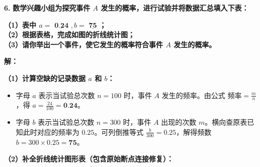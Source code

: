 \documentclass[12pt, a4paper]{ctexrep}
\begin{document}
\vspace{0.6cm}

\textbf{\LARGE 6.} \textbf{数学兴趣小组为探究事件 $A$ 发生的概率，进行试验并将数据汇总填入下表：}

\vspace{0.3cm}
\begin{center}
\renewcommand{\arraystretch}{1.8}
\end{center}

\vspace{0.4cm}
\textbf{（1）表中 $a = \underline{\textbf{  0.24  }}, b = \underline{\textbf{  75  }}$；\\
（2）根据表格，完成如图的折线统计图；\\
（3）请你举出一个事件，使它发生的概率符合事件 $A$ 发生的概率。}

\vspace{0.4cm}
\textbf{解：}

\textbf{（1）计算空缺的记录数据 $a$ 和 $b$：}
\begin{itemize}
    \item 字母 $a$ 表示当试验总次数 $n=100$ 时，事件 $A$ 发生的频率。由公式 $\text{频率} = \frac{m}{n}$，得 $a = \frac{24}{100} = \textbf{0.24}$。
    \item 字母 $b$ 表示当试验总次数 $n=300$ 时，事件 $A$ 出现的次数 $m$。横向查原表已知此时对应的频率为 $0.25$。可列倒推等式 $\frac{b}{300} = 0.25$，解得频数 $b = 300 \times 0.25 = \textbf{75}$。
\end{itemize}

\textbf{（2）补全折线统计图形表（包含原始断点连接修复）：}
\end{document}
